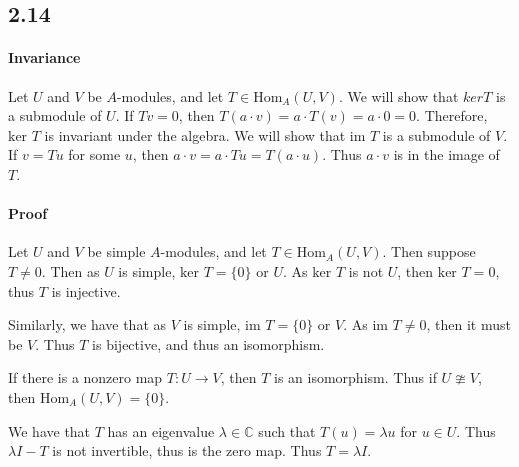 \documentclass[]{article}
\begin{document}
\subsection*{2.14}
\paragraph{Invariance}
Let $U$ and $V$ be $A$-modules, and let $T \in \text{Hom}_A(U, V)$. 
We will show that $ker T$ is a submodule of $U$.
If $Tv = 0$, then $T (a \cdot v) = a \cdot T(v) = a \cdot 0 = 0$. Therefore, $\text{ker } T$ is invariant under the algebra.
We will show that $\text{im } T$ is a submodule of $V$.
If $v = T u$ for some $u$, then $a \cdot v = a \cdot Tu = T (a \cdot u)$. Thus $a \cdot v$ is in the image of $T$.
\paragraph{Proof} 
Let $U$ and $V$ be simple $A$-modules, and let $T \in \text{Hom}_A(U, V)$. 
Then suppose $T \neq 0$. Then as $U$ is simple, $\text{ker } T = \lbrace 0 \rbrace$ or $U$. As $\text{ker } T$ is not $U$, then $\text{ker } T = 0$, thus $T$ is injective.

Similarly, we have that as $V$ is simple, $\text{im } T = \lbrace 0 \rbrace$ or $V$. As $\text{im } T \neq 0$, then it must be $V$. Thus $T$ is bijective, and thus an isomorphism.
\par
If there is a nonzero map $T : U \rightarrow V$, then $T$ is an isomorphism. Thus if $U \ncong V$, then $\text{Hom}_A(U, V) = \lbrace 0 \rbrace$.

\par
We have that $T$ has an eigenvalue $\lambda \in \mathbb{C}$ such that $T(u) = \lambda u$ for $u \in U$. Thus $\lambda I - T$ is not invertible, thus is the zero map. Thus $T = \lambda I$. 
\end{document}
